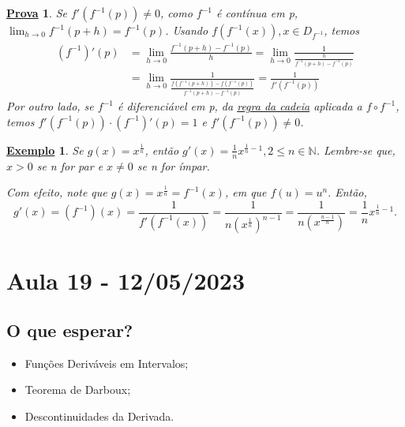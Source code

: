 \documentclass{article}
\newtheorem{example}{\underline{Exemplo}}
\newtheorem*{proof*}{\underline{Prova}}
\begin{document}
   \begin{proof*}
     Se \(f'(f^{-1}(p))\neq0\), como \(f^{-1}\) é contínua em p, \(\lim_{h\to 0}f^{-1}(p+h)=f^{-1}(p)\).
     Usando \(f(f^{-1}(x)), x\in D_{f^{-1}}\), temos 
    \begin{align*}
      (f^{-1})'(p) &= \lim_{h\to 0}\frac{f^{-1}(p+h)-f^{-1}(p)}{h} = \lim_{h\to 0}\frac{1}{\frac{h}{f^{-1}(p+h)-f^{-1}(p)}}\\
                   &= \lim_{h\to 0}\frac{1}{\frac{f(f^{-1}(p+h))-f(f^{-1}(p))}{f^{-1}(p+h)-f^{-1}(p)}} = \frac{1}{f'(f^{-1}(p))}
    \end{align*} 
    Por outro lado, se \(f^{-1}\) é diferenciável em p, da \hyperlink{chain_rule}{regra da cadeia}
    aplicada a \(f\circ{f^{-1}}\), temos \(f'(f^{-1}(p))\cdot (f^{-1})'(p)=1\) e \(f'(f^{-1}(p))\neq0\).
   \end{proof*}
   \begin{example}
     Se \(g(x)=x^{\frac{1}{n}}\), então \(g'(x) = \frac{1}{n}x^{\frac{1}{n}-1}, 2\leq n\in \mathbb{N}\). 
     Lembre-se que, \(x > 0\) se n for par e \(x\neq0\) se n for ímpar.
    
     Com efeito, note que \(g(x) = x^{\frac{1}{n}} = f^{-1}(x)\), em que \(f(u) = u^n.\) Então, 
       \[
         g'(x) = (f^{-1})(x) = \frac{1}{f'(f^{-1}(x))} = \frac{1}{n(x^{\frac{1}{n}})^{n-1}} = \frac{1}{n(x^{\frac{n-1}{n}})} = \frac{1}{n}x^{\frac{1}{n}-1}.
       \]
   \end{example}
\newpage

\section{Aula 19 - 12/05/2023}
\subsection{O que esperar?}
\begin{itemize}
  \item Fun\c cões Deriváveis em Intervalos; 
  \item Teorema de Darboux;
  \item Descontinuidades da Derivada.
\end{itemize}
\end{document}

